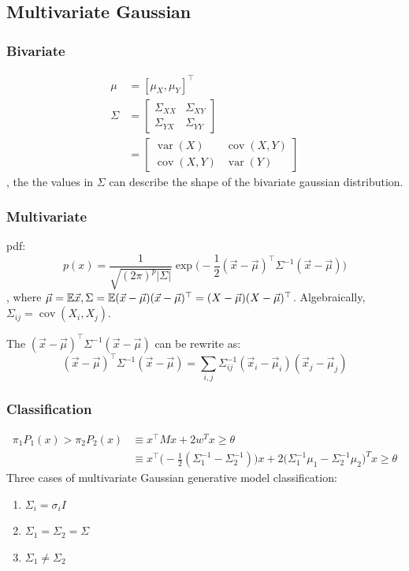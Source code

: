 \documentclass[a4paper]{report}
\begin{document}
\subsection{Multivariate Gaussian}
\subsubsection{Bivariate}
\begin{align*}
\mu &= [\mu_X, \mu_Y]^\top \\
\Sigma &= \begin{bmatrix}
\Sigma_{XX} & \Sigma_{XY} \\
\Sigma_{YX} & \Sigma_{YY} 
\end{bmatrix}\\
&= \begin{bmatrix}
\operatorname{var}(X) & \operatorname{cov}(X,Y) \\
\operatorname{cov}(X,Y) & \operatorname{var}(Y)
\end{bmatrix}
\end{align*}
, the the values in $\Sigma$ can describe the shape of the bivariate gaussian distribution.


\subsubsection{Multivariate}
pdf:
$$
p(x) = \frac{1}{\sqrt{(2\pi)^p|\Sigma|}}\exp\Big(-\frac{1}{2}(\vec x-\vec\mu)^\top\Sigma^{-1}(\vec x-\vec\mu)\Big)
$$
, where $\vec\mu=\mathbb{E} \vec x, \Sigma=\mathbb{E}(\vec x-\vec\mu)(\vec x-\vec\mu)^\top=(X-\vec\mu)(X-\vec\mu)^\top$. Algebraically, $\Sigma_{ij}=\operatorname{cov}(X_i, X_j)$. 

The $(\vec x-\vec\mu)^\top\Sigma^{-1}(\vec x-\vec\mu)$ can be rewrite as: 
$$
(\vec x-\vec\mu)^\top\Sigma^{-1}(\vec x-\vec\mu) = \sum_{i, j} \Sigma^{-1}_{ij} (\vec x_i-\vec \mu_i)(\vec x_j-\vec \mu_j)
$$

\subsubsection{Classification}
\begin{align*}
\pi_1 P_1(x) > \pi_2 P_2(x) &\equiv x^\top Mx+2w^Tx \geq \theta \\
&\equiv x^\top\Big(-\frac{1}{2}(\Sigma_1^{-1}-\Sigma_2^{-1})\Big)x+2\Big(\Sigma_1^{-1}\mu_1-\Sigma_2^{-1}\mu_2\Big)^Tx \geq \theta
\end{align*}
Three cases of multivariate Gaussian generative model classification: 
\begin{enumerate}
\item $\Sigma_i = \sigma_i I$
\item $\Sigma_1=\Sigma_2=\Sigma$
\item $\Sigma_1 \neq \Sigma_2$
\end{enumerate}
\end{document}
